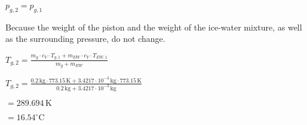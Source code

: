 \( p_{g,2} = p_{g,1} \)  

Because the weight of the piston and the weight of the ice-water mixture, as well as the surrounding pressure, do not change.  

\( T_{g,2} = \frac{m_{g} \cdot c_V \cdot T_{g,1} + m_{EW} \cdot c_V \cdot T_{EW,1}}{m_{g} + m_{EW}} \)  

\( T_{g,2} = \frac{0.2 \, \text{kg} \cdot 773.15 \, \text{K} + 3.4217 \cdot 10^{-3} \, \text{kg} \cdot 773.15 \, \text{K}}{0.2 \, \text{kg} + 3.4217 \cdot 10^{-3} \, \text{kg}} \)  

\( = 289.694 \, \text{K} \)  

\( = 16.54^\circ \text{C} \)